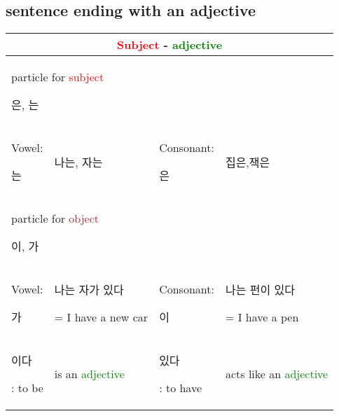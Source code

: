 \subsection{sentence ending with an adjective}
\begin{tabular}{|p{100pt}p{100pt}|p{100pt}p{100pt}|}
\hline
	\multicolumn{4}{|c|}{\textcolor{red}{Subject} - \textcolor{green}{adjective}}\\
\hline
	\multicolumn{4}{|l|}{particle for \textcolor{red}{subject} 	\begin{Korean} 은, 는\end{Korean}}\\
	
	Vowel:\begin{Korean} 는\end{Korean} & \begin{Korean} 나는, 자는 \end{Korean} &
	Consonant:\begin{Korean}은\end{Korean} & \begin{Korean} 집은,잭은 \end{Korean}\\
\hline
	\multicolumn{4}{|l|}{particle for \textcolor{brown}{object} 	\begin{Korean} 이, 가\end{Korean}}\\
	
	Vowel: \begin{Korean} 가\end{Korean} & \begin{Korean} 나는 자가 있다 \end{Korean} =   I have a new car&
	Consonant: \begin{Korean}이\end{Korean} & \begin{Korean} 나는 펀이 있다 \end{Korean} =   I have a pen\\
\hline	

	\begin{Korean}이다\end{Korean}: to be & is an \textcolor{green}{adjective}&		
	\begin{Korean}있다\end{Korean}: to have & acts like an \textcolor{green}{adjective}\\
\hline	
\end{tabular}

